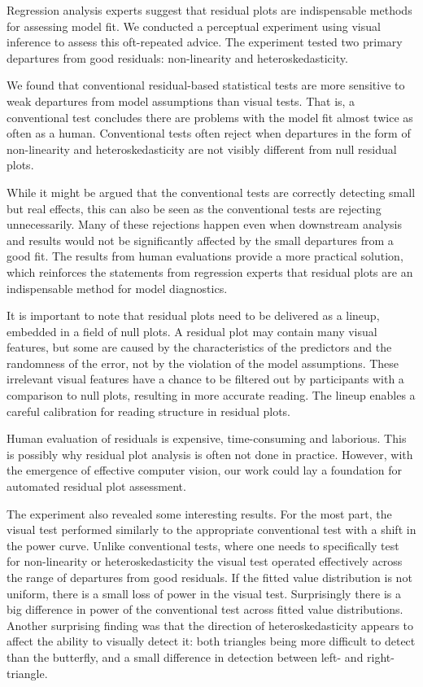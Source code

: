 \documentclass[]{interact}
\theoremstyle{plain}%
\theoremstyle{definition}
\theoremstyle{remark}
\begin{document}
Regression analysis experts suggest that residual plots are
indispensable methods for assessing model fit. We conducted a perceptual
experiment using visual inference to assess this oft-repeated advice.
The experiment tested two primary departures from good residuals:
non-linearity and heteroskedasticity.

We found that conventional residual-based statistical tests are more
sensitive to weak departures from model assumptions than visual tests.
That is, a conventional test concludes there are problems with the model
fit almost twice as often as a human. Conventional tests often reject
when departures in the form of non-linearity and heteroskedasticity are
not visibly different from null residual plots.

While it might be argued that the conventional tests are correctly
detecting small but real effects, this can also be seen as the
conventional tests are rejecting unnecessarily. Many of these rejections
happen even when downstream analysis and results would not be
significantly affected by the small departures from a good fit. The
results from human evaluations provide a more practical solution, which
reinforces the statements from regression experts that residual plots
are an indispensable method for model diagnostics.

It is important to note that residual plots need to be delivered as a
lineup, embedded in a field of null plots. A residual plot may contain
many visual features, but some are caused by the characteristics of the
predictors and the randomness of the error, not by the violation of the
model assumptions. These irrelevant visual features have a chance to be
filtered out by participants with a comparison to null plots, resulting
in more accurate reading. The lineup enables a careful calibration for
reading structure in residual plots.

Human evaluation of residuals is expensive, time-consuming and
laborious. This is possibly why residual plot analysis is often not done
in practice. However, with the emergence of effective computer vision,
our work could lay a foundation for automated residual plot assessment.

The experiment also revealed some interesting results. For the most
part, the visual test performed similarly to the appropriate
conventional test with a shift in the power curve. Unlike conventional
tests, where one needs to specifically test for non-linearity or
heteroskedasticity the visual test operated effectively across the range
of departures from good residuals. If the fitted value distribution is
not uniform, there is a small loss of power in the visual test.
Surprisingly there is a big difference in power of the conventional test
across fitted value distributions. Another surprising finding was that
the direction of heteroskedasticity appears to affect the ability to
visually detect it: both triangles being more difficult to detect than
the butterfly, and a small difference in detection between left- and
right-triangle.
\end{document}

